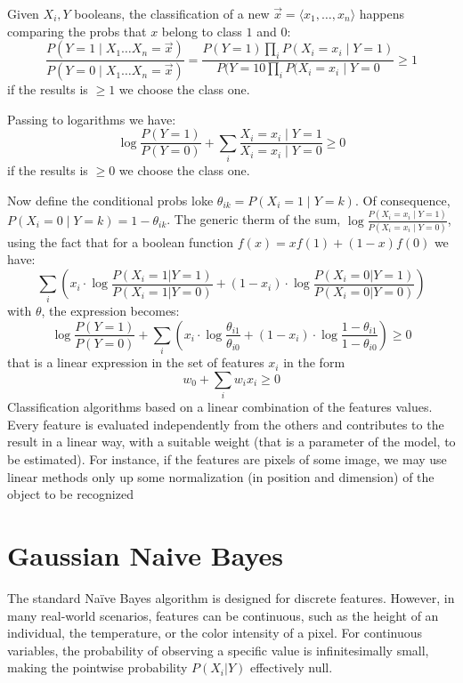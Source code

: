 
Given $X_i, Y$ booleans, the classification of a new $\vec{x} = \langle x_1,\dots, x_n\rangle$ happens comparing the probs that $x$ belong to class $1$ and $0$:
\[
    \frac{P(Y=1 \mid X_1 \dots X_n = \vec{x})}{P(Y=0 \mid X_1 \dots X_n = \vec{x})} = \frac{P(Y=1)\prod_{i}P(X_i = x_i\mid Y=1)}{P(Y=10\prod_{i}P(X_i = x_i\mid Y=0} \geq 1
\] 
if the results is $\geq 1$ we choose the class one.

Passing to logarithms we have:
\[
    \log{\frac{P(Y=1)}{P(Y=0)} + \sum_i\frac{X_i=x_i\mid Y=1}{X_i=x_i\mid Y=0}}\geq 0
\]
if the results is $\geq 0$ we choose the class one. 

Now define the conditional probs loke $\theta_{ik} = P(X_i = 1\mid  Y=k)$. Of consequence, $P(X_i = 0 \mid Y=k)=1-\theta_{ik}$. The generic therm of the sum, $\log{\frac{P(X_i =x_i\mid Y=1)}{P(X_i =x_i\mid Y=0)}}$, using the fact that for a boolean function $f(x)=xf(1)+(1-x)f(0)$ we have:
$$
    \sum_i \left( x_i \cdot \log\frac{P(X_i=1|Y=1)}{P(X_i=1|Y=0)} + (1-x_i) \cdot \log\frac{P(X_i=0|Y=1)}{P(X_i=0|Y=0)} \right)
$$
    with $\theta$, the expression becomes:
$$
    \log\frac{P(Y=1)}{P(Y=0)} + \sum_i \left( x_i \cdot \log\frac{\theta_{i1}}{\theta_{i0}} + (1-x_i) \cdot \log\frac{1-\theta_{i1}}{1-\theta_{i0}} \right) \ge 0
$$
that is a linear expression in the set of features $x_i$ in the form
\[
    w_0 + \sum_i w_i x_i \geq 0
\]
Classification algorithms based on a linear combination of the
features values.
Every feature is evaluated independently from the others and
contributes to the result in a linear way, with a suitable weight
(that is a parameter of the model, to be estimated).
For instance, if the features are pixels of some image, we may use
linear methods only up some normalization (in position and
dimension) of the object to be recognized

\section{Gaussian Naive Bayes}
The standard Naïve Bayes algorithm is designed for discrete features. However, in many real-world scenarios, features can be continuous, such as the height of an individual, the temperature, or the color intensity of a pixel. For continuous variables, the probability of observing a specific value is infinitesimally small, making the pointwise probability $P(X_i | Y)$ effectively null.

